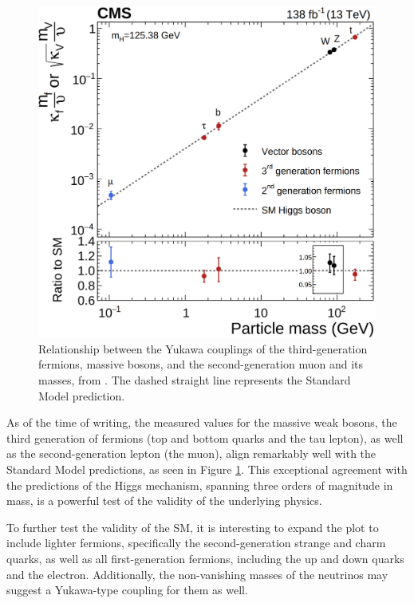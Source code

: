 \begin{figure}[!ht]
    \vspace*{-0.0cm}
    \centering
    \setlength{\mylength}{\textwidth}
    \includegraphics[width=0.60\mylength]{resources/Yukawa_couplings.png}
    \vspace*{-0.0cm}
    \caption{Relationship between the Yukawa couplings of the third-generation fermions, massive bosons, and the second-generation muon and its masses, from \cite{CMS:2022dwd}. The dashed straight line represents the Standard Model prediction.}
    \label{fig:Yukawa_couplings}
    \vspace*{-0.0cm}
\end{figure}

As of the time of writing, the measured values for the massive weak bosons, the third generation of fermions (top and bottom quarks and the tau lepton), as well as the second-generation lepton (the muon), align remarkably well with the Standard Model predictions, as seen in Figure \ref{fig:Yukawa_couplings}. This exceptional agreement with the predictions of the Higgs mechanism, spanning three orders of magnitude in mass, is a powerful test of the validity of the underlying physics.

To further test the validity of the SM, it is interesting to expand the plot to include lighter fermions, specifically the second-generation strange and charm quarks, as well as all first-generation fermions, including the up and down quarks and the electron. Additionally, the non-vanishing masses of the neutrinos may suggest a Yukawa-type coupling for them as well.

